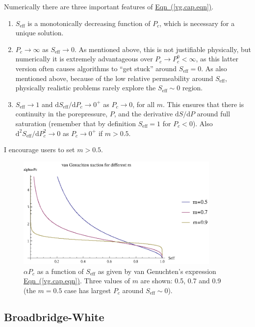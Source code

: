 \documentclass[12pt]{report}
\begin{document}
Numerically there are three important features of
\hyperref[vg.cap.eqn]{Eqn~(\ref*{vg.cap.eqn})}.
\begin{enumerate}
\item $S_{\mathrm{eff}}$ is a monotonically decreasing function of
  $P_{c}$, which is necessary for a unique solution.
\item $P_{c}\rightarrow \infty$ as $S_{\mathrm{eff}}\rightarrow 0$.  As mentioned
above, this is not justifiable physically, but numerically it is
extremely advantageous over $P_{c}\rightarrow P_{c}^{0}<\infty$, as
this latter version often causes algorithms to ``get stuck'' around
$S_{\mathrm{eff}} = 0$.  As also mentioned above, because of the low
relative permeability around $S_{\mathrm{eff}}$, physically realistic
problems rarely explore the $S_{\mathrm{eff}}\sim 0$ region.
\item $S_{\mathrm{eff}}\rightarrow 1$ and
  $\mathrm{d}S_{\mathrm{eff}}/\mathrm{d}P_{c} \rightarrow 0^{+}$ as
  $P_{c}\rightarrow 0$, for all $m$.  This ensures that there is
  continuity in the porepressure, $P$, and the derivative
  $\mathrm{d}S/\mathrm{d}P$ around full saturation (remember that by definition
  $S_{\mathrm{eff}}=1$ for $P_{c}<0$).  Also
  $\mathrm{d}^{2}S_{\mathrm{eff}}/\mathrm{d}P_{c}^{2} \rightarrow 0$
  as $P_{c}\rightarrow 0^{+}$ if $m>0.5$.
\end{enumerate}
I encourage users to set $m>0.5$.

\begin{figure}[htb]
\centering
\includegraphics[width=10cm]{van_genuchten_pc.eps}
\caption{$\alpha P_{c}$ as a function of $S_{\mathrm{eff}}$ as given
  by van Genuchten's expression
  \hyperref[vg.cap.eqn]{Eqn~(\ref*{vg.cap.eqn})}.  Three values of $m$
  are shown: 0.5, 0.7 and 0.9 (the $m=0.5$ case has largest $P_{c}$
  around $S_{\mathrm{eff}}\sim 0$).}
\label{van_genuchten_pc.fig}
\end{figure}

\subsection{Broadbridge-White}
\end{document}
